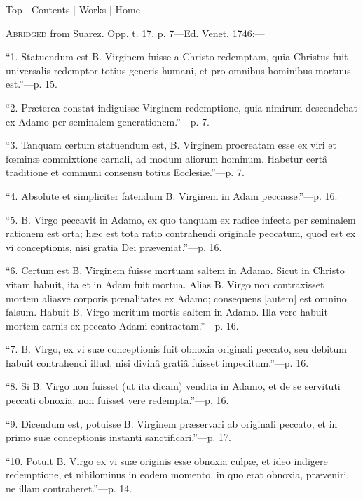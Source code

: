 Top | Contents | Works | Home











A\textsc{bridged} from Suarez. Opp. t. 17, p. 7—Ed.
Venet. 1746:—


``1. Statuendum est B. Virginem fuisse a Christo redemptam, quia
Christus fuit universalis redemptor totius generis humani, et pro
omnibus hominibus mortuus est.''—p. 15.


``2. Præterea constat indiguisse Virginem redemptione, quia
nimirum descendebat ex Adamo per seminalem generationem.''—p. 7.


``3. Tanquam certum statuendum est, B. Virginem procreatam esse
ex viri et fœminæ commixtione carnali, ad modum aliorum hominum.
Habetur certâ traditione et communi consensu totius Ecclesiæ.''—p.
7.


``4. Absolute et simpliciter fatendum B. Virginem in Adam
peccasse.''—p. 16.


``5. B. Virgo peccavit in Adamo, ex quo tanquam ex radice infecta
per seminalem rationem est orta; hæc est tota ratio contrahendi
originale peccatum, quod est ex vi conceptionis, nisi gratia Dei
præveniat.''—p. 16.


``6. Certum est B. Virginem fuisse mortuam saltem in Adamo. Sicut
in Christo vitam habuit, ita et in Adam fuit mortua. Alias B.
Virgo non contraxisset mortem aliasve corporis pœnalitates ex Adamo;
consequens [autem] est omnino falsum. Habuit B. Virgo meritum mortis
saltem in Adamo. Illa vere habuit mortem carnis ex peccato Adami
contractam.''—p. 16.


``7. B. Virgo, ex vi suæ conceptionis fuit obnoxia originali
peccato, seu debitum habuit contrahendi illud, nisi divinâ gratiâ
fuisset impeditum.''—p. 16.


``8. Si B. Virgo non fuisset (ut ita dicam) vendita in Adamo, et
de se servituti peccati obnoxia, non fuisset vere redempta.''—p.
16.


``9. Dicendum est, potuisse B. Virginem præservari ab originali
peccato, et in primo suæ conceptionis instanti sanctificari.''—p.
17.


``10. Potuit B. Virgo ex vi suæ originis esse obnoxia culpæ, et
ideo indigere redemptione, et nihilominus in eodem momento, in quo erat
obnoxia, præveniri, ne illam contraheret.''—p. 14.


